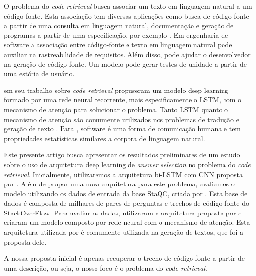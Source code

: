 \documentclass[12pt]{article}
\begin{document}
O problema do \textit{code retrieval} busca associar um texto em linguagem natural a um código-fonte. Esta associação tem diversas aplicações como busca de código-fonte a partir de uma consulta em linguagem natural, documentação e geração de programas a partir de uma especificação, por exemplo \cite{Allamanis:2018:SML}. Em engenharia de software a associação entre código-fonte e texto em linguagem natural pode auxiliar na rastreabilidade de requisitos. Além disso, pode ajudar o desenvolvedor na geração de código-fonte. Um modelo pode gerar testes de unidade a partir de uma estória de usuário.

\cite{iyer-etal-2016-summarizing} em seu trabalho sobre \textit{code retrieval} propuseram um modelo deep learning formado por uma rede neural recorrente, mais especificamente o LSTM, com o mecanismo de atenção para solucionar o problema. Tanto LSTM quanto o mecanismo de atenção são comumente utilizados nos problemas de tradução e geração de texto \cite{bahdanau2014neural, rush-etal-2015-neural}. Para \cite{Allamanis:2018:SML}, software é uma forma de comunicação humana e tem propriedades estatísticas similares a corpora de linguagem natural. 

Este presente artigo busca apresentar os resultados preliminares de um estudo sobre o uso de arquitetura deep learning de \textit{answer selection} no problema do \textit{code retrieval}. Inicialmente, utilizaremos a arquitetura bi-LSTM com CNN proposta por \cite{tan-lstm-qa}. Além de propor uma nova arquitetura para este problema, avaliamos o modelo utilizando os dados de entrada da base StaQC, criada por \cite{Yao-staqc:2018}. Esta base de dados é composta de milhares de pares de perguntas e trechos de código-fonte do StackOverFlow. Para avaliar os dados, \cite{Yao-staqc:2018} utilizaram a arquitetura proposta por \cite{iyer-etal-2016-summarizing} e criaram um modelo composto por rede neural com o mecanismo de atenção. Esta arquitetura utilizada por \cite{iyer-etal-2016-summarizing} é comumente utilizada na geração de textos, que foi a proposta dele. 

 A nossa proposta inicial é apenas recuperar o trecho de código-fonte a partir de uma descrição, ou seja, o nosso foco é o problema do \textit{code retrieval}.



\end{document}
